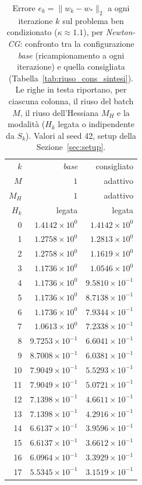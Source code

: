 \begin{table}[H]
\centering
\footnotesize
\renewcommand{\arraystretch}{0.85}
\setlength{\tabcolsep}{8pt}
\caption{Errore $e_k=\|w_k-w_*\|_2$ a ogni iterazione $k$ sul problema ben condizionato ($\kappa\approx 1.1$), per \emph{Newton-CG}: confronto tra la configurazione \emph{base} (ricampionamento a ogni iterazione) e quella consigliata (Tabella~\ref{tab:riuso_cons_sintesi}). Le righe in testa riportano, per ciascuna colonna, il riuso del batch $M$, il riuso dell'Hessiana $M_H$ e la modalità ($H_k$ legata o indipendente da $S_k$). Valori al seed 42, setup della Sezione~\ref{sec:setup}.}
\label{tab:riuso_cons_bencond_ncg}
\begin{tabular}{@{}rrr@{}}
\toprule
$k$ & \emph{base} & consigliato\\
$M$ & $1$ & adattivo\\
$M_H$ & $1$ & adattivo\\
$H_k$ & legata & legata\\
\midrule
0 & $1.4142\times10^{0}$ & $1.4142\times10^{0}$\\
1 & $1.2758\times10^{0}$ & $1.2813\times10^{0}$\\
2 & $1.2758\times10^{0}$ & $1.1619\times10^{0}$\\
3 & $1.1736\times10^{0}$ & $1.0546\times10^{0}$\\
4 & $1.1736\times10^{0}$ & $9.5810\times10^{-1}$\\
5 & $1.1736\times10^{0}$ & $8.7138\times10^{-1}$\\
6 & $1.1736\times10^{0}$ & $7.9344\times10^{-1}$\\
7 & $1.0613\times10^{0}$ & $7.2338\times10^{-1}$\\
8 & $9.7253\times10^{-1}$ & $6.6041\times10^{-1}$\\
9 & $8.7008\times10^{-1}$ & $6.0381\times10^{-1}$\\
10 & $7.9049\times10^{-1}$ & $5.5293\times10^{-1}$\\
11 & $7.9049\times10^{-1}$ & $5.0721\times10^{-1}$\\
12 & $7.1398\times10^{-1}$ & $4.6611\times10^{-1}$\\
13 & $7.1398\times10^{-1}$ & $4.2916\times10^{-1}$\\
14 & $6.6137\times10^{-1}$ & $3.9596\times10^{-1}$\\
15 & $6.6137\times10^{-1}$ & $3.6612\times10^{-1}$\\
16 & $6.0964\times10^{-1}$ & $3.3929\times10^{-1}$\\
17 & $5.5345\times10^{-1}$ & $3.1519\times10^{-1}$\\

\end{tabular}
\end{table}
